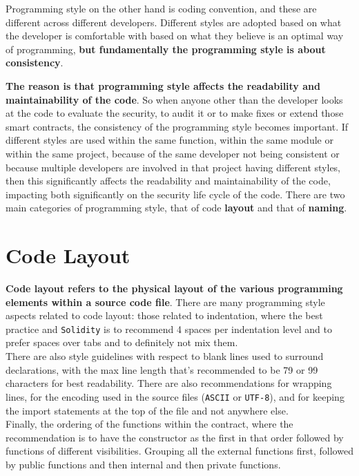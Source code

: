 Programming style on the other hand is coding convention, and these are different across different developers. Different styles are adopted based on what the developer is comfortable with based on what they believe is an optimal way of programming, \textbf{but fundamentally the programming style is about consistency}.

\textbf{The reason is that programming style affects the readability and maintainability of the code}. So when anyone other than the developer looks at the code to evaluate the security, to audit it or to make fixes or extend those smart contracts, the consistency of the programming style becomes important. If different styles are used within the same function, within the same module or within the same project, because of the same developer not being consistent or because multiple developers are involved in that project having different styles, then this significantly affects the readability and maintainability of the code, impacting both significantly on the security life cycle of the code. There are two main categories of programming style, that of code \textbf{layout} and that of \textbf{naming}.

\section{Code Layout}
\textbf{Code layout refers to the physical layout of the various programming elements within a source code file}. There are many programming style aspects related to code layout: those related to indentation, where the best practice and \texttt{Solidity} is to recommend 4 spaces per indentation level and to prefer spaces over tabs and to definitely not mix them.\\

There are also style guidelines with respect to blank lines used to surround declarations, with the max line length that's recommended to be 79 or 99 characters for best readability. There are also recommendations for wrapping lines, for the encoding used in the source files (\texttt{ASCII} or \texttt{UTF-8}), and for keeping the import statements at the top of the file and not anywhere else.\\

Finally, the ordering of the functions within the contract, where the recommendation is to have the constructor as the first in that order followed by functions of different visibilities. Grouping all the external functions first, followed by public functions and then internal and then private functions.

